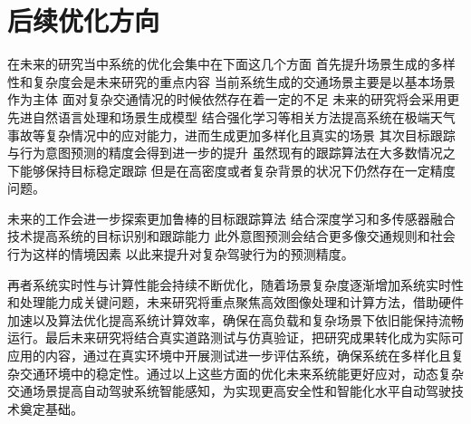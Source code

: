 \section{后续优化方向}

在未来的研究当中系统的优化会集中在下面这几个方面 首先提升场景生成的多样性和复杂度会是未来研究的重点内容 当前系统生成的交通场景主要是以基本场景作为主体 面对复杂交通情况的时候依然存在着一定的不足 未来的研究将会采用更先进自然语言处理和场景生成模型 结合强化学习等相关方法提高系统在极端天气事故等复杂情况中的应对能力，进而生成更加多样化且真实的场景 其次目标跟踪与行为意图预测的精度会得到进一步的提升 虽然现有的跟踪算法在大多数情况之下能够保持目标稳定跟踪 但是在高密度或者复杂背景的状况下仍然存在一定精度问题。

未来的工作会进一步探索更加鲁棒的目标跟踪算法 结合深度学习和多传感器融合技术提高系统的目标识别和跟踪能力 此外意图预测会结合更多像交通规则和社会行为这样的情境因素 以此来提升对复杂驾驶行为的预测精度。

再者系统实时性与计算性能会持续不断优化，随着场景复杂度逐渐增加系统实时性和处理能力成关键问题，未来研究将重点聚焦高效图像处理和计算方法，借助硬件加速以及算法优化提高系统计算效率，确保在高负载和复杂场景下依旧能保持流畅运行。最后未来研究将结合真实道路测试与仿真验证，把研究成果转化成为实际可应用的内容，通过在真实环境中开展测试进一步评估系统，确保系统在多样化且复杂交通环境中的稳定性。通过以上这些方面的优化未来系统能更好应对，动态复杂交通场景提高自动驾驶系统智能感知，为实现更高安全性和智能化水平自动驾驶技术奠定基础。
